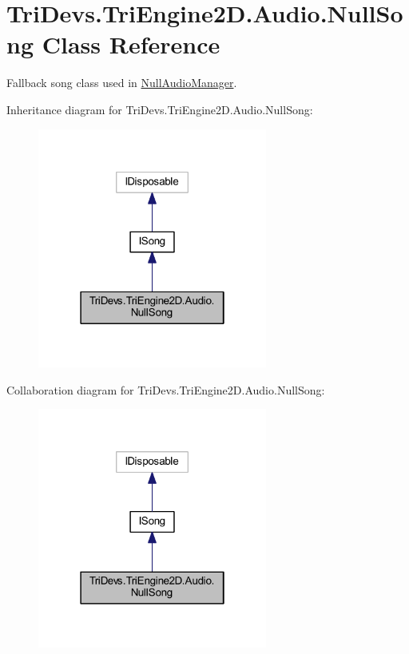 \hypertarget{class_tri_devs_1_1_tri_engine2_d_1_1_audio_1_1_null_song}{\section{Tri\-Devs.\-Tri\-Engine2\-D.\-Audio.\-Null\-Song Class Reference}
\label{class_tri_devs_1_1_tri_engine2_d_1_1_audio_1_1_null_song}
}


Fallback song class used in \hyperlink{class_tri_devs_1_1_tri_engine2_d_1_1_audio_1_1_null_audio_manager}{Null\-Audio\-Manager}.  




Inheritance diagram for Tri\-Devs.\-Tri\-Engine2\-D.\-Audio.\-Null\-Song\-:\nopagebreak
\begin{figure}[H]
\begin{center}
\leavevmode
\includegraphics[width=214pt]{class_tri_devs_1_1_tri_engine2_d_1_1_audio_1_1_null_song__inherit__graph}
\end{center}
\end{figure}


Collaboration diagram for Tri\-Devs.\-Tri\-Engine2\-D.\-Audio.\-Null\-Song\-:\nopagebreak
\begin{figure}[H]
\begin{center}
\leavevmode
\includegraphics[width=214pt]{class_tri_devs_1_1_tri_engine2_d_1_1_audio_1_1_null_song__coll__graph}
\end{center}
\end{figure}
